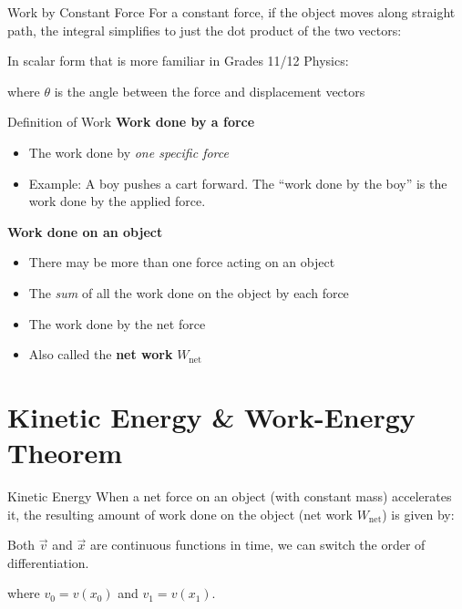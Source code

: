 \documentclass[12pt,compress,aspectratio=169]{beamer}
\begin{document}
\begin{frame}{Work by Constant Force}
  For a constant force, if the object moves along straight path, the integral
  simplifies to just the dot product of the two vectors:


  In scalar form that is more familiar in Grades 11/12 Physics:


  where $\theta$ is the angle between the force and displacement vectors
\end{frame}



\begin{frame}{Definition of Work}
  \textbf{Work done by a force}
  \begin{itemize}
  \item The work done by \emph{one specific force}
  \item Example: A boy pushes a cart forward. The ``work done by the boy'' is
    the work done by the applied force.
  \end{itemize}

  \vspace{.15in}\textbf{Work done on an object}
  \begin{itemize}
  \item There may be more than one force acting on an object
  \item The \emph{sum} of all the work done on the object by each force
  \item The work done by the net force
  \item Also called the \textbf{net work} $W_\text{net}$
  \end{itemize}
\end{frame}



\section{Kinetic Energy \& Work-Energy Theorem}

\begin{frame}{Kinetic Energy}
  When a net force on an object (with constant mass) accelerates it, the
  resulting amount of work done on the object (net work $W_\text{net}$) is
  given by:


  Both $\vec v$ and $\vec x$ are continuous functions in time, we can switch
  the order of differentiation.
  

  where $v_0=v(x_0)$ and $v_1=v(x_1)$.
\end{frame}
\end{document}
